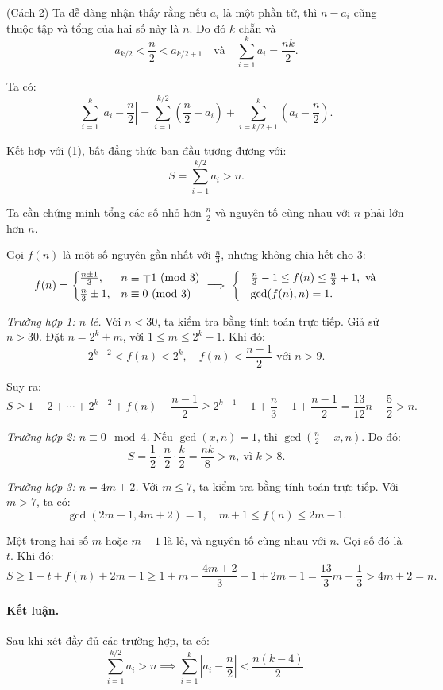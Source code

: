 \documentclass[../01-divisibility.tex]{subfiles}
\begin{document}
\begin{soln}(Cách 2)\footnotemark
	Ta dễ dàng nhận thấy rằng nếu \( a_i \) là một phần tử, thì \( n - a_i \) cũng thuộc tập và tổng của hai số này là \( n \). Do đó $k$ chẵn và
	\[
		a_{k/2} < \frac{n}{2} < a_{k/2+1}\quad \text{và}\quad \sum_{i=1}^k a_i = \frac{nk}{2}. \tag{1}
	\]
	
	Ta có:
	\[
		\sum_{i=1}^{k} \left| a_i - \frac{n}{2} \right| = \sum_{i=1}^{k/2} \left(\frac{n}{2} - a_i\right) + \sum_{i=k/2+1}^{k} \left(a_i - \frac{n}{2}\right).
	\]

	Kết hợp với (1), bất đẳng thức ban đầu tương đương với:
	\[
		S = \sum_{i=1}^{k/2} a_i > n.
	\]
	
	Ta cần chứng minh tổng các số nhỏ hơn \( \frac{n}{2} \) và nguyên tố cùng nhau với \( n \) phải lớn hơn \( n \).
	
	Gọi \( f(n) \) là một số nguyên gần nhất với \( \frac{n}{3} \), nhưng không chia hết cho 3:
	\[
		f(n) = 
		\begin{cases}
			\frac{n \pm 1}{3}, & n \equiv \mp 1 \Mod{3} \\
			\frac{n}{3} \pm 1, & n \equiv 0 \Mod{3}
		\end{cases}
		\implies 
		\begin{cases}
			&\frac{n}{3} - 1 \le f(n) \le \frac{n}{3} + 1,\ \text{và}\\
			&\gcd(f(n), n) = 1.
		\end{cases}
	\]
	
	\textit{Trường hợp 1: \( n \) lẻ.} Với \( n < 30 \), ta kiểm tra bằng tính toán trực tiếp.
	Giả sử \( n > 30 \). Đặt \( n = 2^k + m \), với \( 1 \le m \le 2^k - 1 \). Khi đó:
	\[
		2^{k-2} < f(n) < 2^k, \quad f(n) < \frac{n - 1}{2} \text{ với } n > 9.
	\]
	
	Suy ra:
	\[
		S \ge 1 + 2 + \cdots + 2^{k-2} + f(n) + \frac{n - 1}{2} \ge 2^{k-1} - 1 + \frac{n}{3} - 1 + \frac{n - 1}{2} = \frac{13}{12}n - \frac{5}{2} > n.
	\]
	
	\textit{Trường hợp 2: \( n \equiv 0 \mod 4 \).}
	Nếu \( \gcd(x,n) = 1 \), thì \( \gcd\left(\frac{n}{2} - x, n\right) \). Do đó:
	\[
		S = \frac{1}{2} \cdot \frac{n}{2} \cdot \frac{k}{2} = \frac{nk}{8} > n,\ \text{vì } k > 8.
	\]
	
	\textit{Trường hợp 3: \( n = 4m + 2 \).} Với \( m \le 7 \), ta kiểm tra bằng tính toán trực tiếp.
	Với \( m > 7 \), ta có:
	\[
		\gcd(2m - 1, 4m + 2) = 1, \quad m + 1 \le f(n) \le 2m - 1.
	\]

	Một trong hai số \( m \) hoặc \( m + 1 \) là lẻ, và nguyên tố cùng nhau với \( n \). Gọi số đó là \( t \). Khi đó:
	\[
		S \ge 1 + t + f(n) + 2m - 1 \ge 1 + m + \frac{4m + 2}{3} - 1 + 2m - 1 = \frac{13}{3}m - \frac{1}{3} > 4m + 2 = n.
	\]
	
	\paragraph{Kết luận.} Sau khi xét đầy đủ các trường hợp, ta có:
	\[
		\sum_{i=1}^{k/2} a_i > n \implies \sum_{i=1}^k \left| a_i - \frac{n}{2} \right| < \frac{n(k - 4)}{2}.
	\]
\end{soln}

\end{document}
